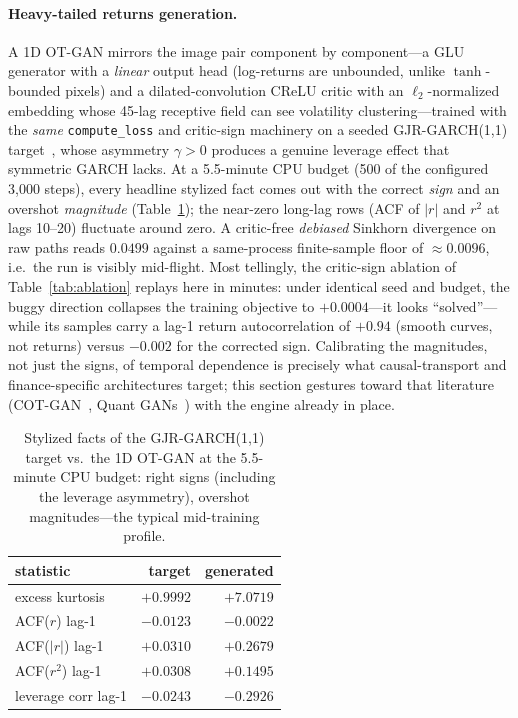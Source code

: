 \documentclass[10pt,twocolumn]{article}
\begin{document}
\paragraph{Heavy-tailed returns generation.} A 1D OT-GAN mirrors the image pair
component by component---a GLU generator with a \emph{linear} output head
(log-returns are unbounded, unlike $\tanh$-bounded pixels) and a dilated-convolution
CReLU critic with an $\ell_2$-normalized embedding whose 45-lag receptive field can
see volatility clustering---trained with the \emph{same} \texttt{compute\_loss} and
critic-sign machinery on a seeded GJR-GARCH(1,1) target~\cite{glosten1993}, whose
asymmetry $\gamma>0$ produces a genuine leverage effect that symmetric GARCH lacks.
At a 5.5-minute CPU budget (500 of the configured 3{,}000 steps), every headline
stylized fact comes out with the correct \emph{sign} and an overshot
\emph{magnitude} (Table~\ref{tab:finance}); the near-zero long-lag rows (ACF of
$|r|$ and $r^2$ at lags 10--20) fluctuate around zero. A critic-free \emph{debiased}
Sinkhorn divergence on raw paths reads $0.0499$ against a same-process finite-sample
floor of $\approx 0.0096$, i.e.\ the run is visibly mid-flight. Most tellingly, the
critic-sign ablation of Table~\ref{tab:ablation} replays here in minutes: under
identical seed and budget, the buggy direction collapses the training objective to
$+0.0004$---it looks ``solved''---while its samples carry a lag-1 return
autocorrelation of $+0.94$ (smooth curves, not returns) versus $-0.002$ for the
corrected sign. Calibrating the magnitudes, not just the signs, of temporal
dependence is precisely what causal-transport and finance-specific architectures
target; this section gestures toward that literature (COT-GAN~\cite{xu2020}, Quant
GANs~\cite{wiese2020}) with the engine already in place.

\begin{table}[h]
\centering
\footnotesize
\begin{tabular}{lrr}
\toprule
statistic & target & generated \\
\midrule
excess kurtosis & $+0.9992$ & $+7.0719$ \\
ACF($r$) lag-1 & $-0.0123$ & $-0.0022$ \\
ACF($|r|$) lag-1 & $+0.0310$ & $+0.2679$ \\
ACF($r^2$) lag-1 & $+0.0308$ & $+0.1495$ \\
leverage corr lag-1 & $-0.0243$ & $-0.2926$ \\
\bottomrule
\end{tabular}
\caption{Stylized facts of the GJR-GARCH(1,1) target vs.\ the 1D OT-GAN at the
5.5-minute CPU budget: right signs (including the leverage asymmetry), overshot
magnitudes---the typical mid-training profile.}
\label{tab:finance}
\end{table}
\end{document}
